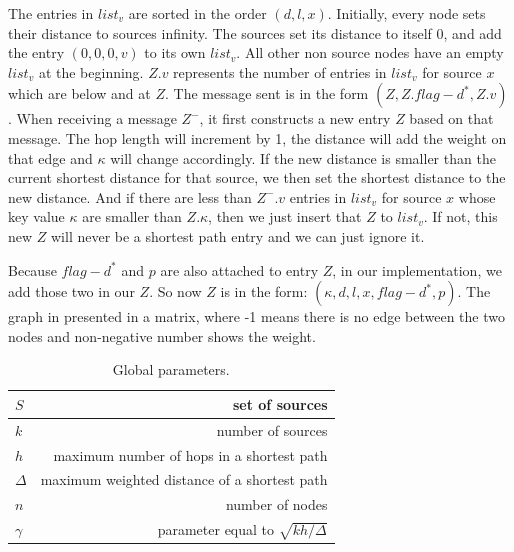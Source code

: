\documentclass[11pt]{article}  %
\begin{document}
The entries in $list_v$ are sorted in the order $(d,l,x)$. Initially, every node sets their distance to sources infinity. The sources set its distance to itself 0, and add the entry $(0,0,0,v)$ to its own $list_v$. All other non source nodes have an empty $list_v$ at the beginning. $Z.v$ represents the number of entries in $list_v$ for source $x$ which are below and at $Z$. The message sent is in the form $(Z,Z.flag-d^*,Z.v)$. When receiving a message $Z^-$, it first constructs a new entry $Z$ based on that message. The hop length will increment by 1, the distance will add the weight on that edge and $\kappa$ will change accordingly. If the new distance is smaller than the current shortest distance for that source, we then set the shortest distance to the new distance. And if there are less than $Z^-.v$ entries in $list_v$ for source $x$ whose key value $\kappa$ are smaller than $Z.\kappa$, then we just insert that $Z$ to $list_v$. If not, this new $Z$ will never be a shortest path entry and we can just ignore it. \par

Because $flag-d^*$ and $p$ are also attached to entry $Z$, in our implementation, we add those two in our $Z$. So now $Z$ is in the form: $(\kappa, d, l, x, flag-d^*, p)$. The graph in presented in a matrix, where -1 means there is no edge between the two nodes and non-negative number shows the weight. \par

\begin{table}[h!]
  \begin{center}
    \caption{Global parameters.}
    \begin{tabular}{l|r} %
      \hline
      $S$ & set of sources\\
      \hline
      $k$ & number of sources\\
      \hline
      $h$ & maximum number of hops in a shortest path\\
      \hline
      $\Delta$ & maximum weighted distance of a shortest path\\
      \hline
      $n$ & number of nodes\\
      \hline
      $\gamma$ & parameter equal to $\sqrt{kh/\Delta}$\\
    \end{tabular}
  \end{center}
\end{table}
\end{document}
